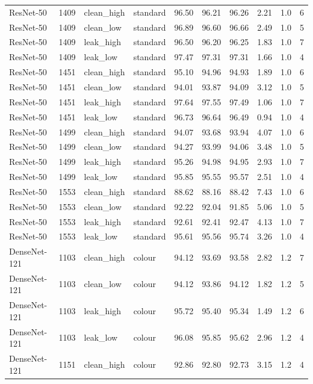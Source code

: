 {\begin{longtable}{lrllrrrrrr}
ResNet-50 & 1409 & clean\_high & standard & 96.50 & 96.21 & 96.26 & 2.21 & 1.0 & 6 \\
ResNet-50 & 1409 & clean\_low & standard & 96.89 & 96.60 & 96.66 & 2.49 & 1.0 & 5 \\
ResNet-50 & 1409 & leak\_high & standard & 96.50 & 96.20 & 96.25 & 1.83 & 1.0 & 7 \\
ResNet-50 & 1409 & leak\_low & standard & 97.47 & 97.31 & 97.31 & 1.66 & 1.0 & 4 \\
ResNet-50 & 1451 & clean\_high & standard & 95.10 & 94.96 & 94.93 & 1.89 & 1.0 & 6 \\
ResNet-50 & 1451 & clean\_low & standard & 94.01 & 93.87 & 94.09 & 3.12 & 1.0 & 5 \\
ResNet-50 & 1451 & leak\_high & standard & 97.64 & 97.55 & 97.49 & 1.06 & 1.0 & 7 \\
ResNet-50 & 1451 & leak\_low & standard & 96.73 & 96.64 & 96.49 & 0.94 & 1.0 & 4 \\
ResNet-50 & 1499 & clean\_high & standard & 94.07 & 93.68 & 93.94 & 4.07 & 1.0 & 6 \\
ResNet-50 & 1499 & clean\_low & standard & 94.27 & 93.99 & 94.06 & 3.48 & 1.0 & 5 \\
ResNet-50 & 1499 & leak\_high & standard & 95.26 & 94.98 & 94.95 & 2.93 & 1.0 & 7 \\
ResNet-50 & 1499 & leak\_low & standard & 95.85 & 95.55 & 95.57 & 2.51 & 1.0 & 4 \\
ResNet-50 & 1553 & clean\_high & standard & 88.62 & 88.16 & 88.42 & 7.43 & 1.0 & 6 \\
ResNet-50 & 1553 & clean\_low & standard & 92.22 & 92.04 & 91.85 & 5.06 & 1.0 & 5 \\
ResNet-50 & 1553 & leak\_high & standard & 92.61 & 92.41 & 92.47 & 4.13 & 1.0 & 7 \\
ResNet-50 & 1553 & leak\_low & standard & 95.61 & 95.56 & 95.74 & 3.26 & 1.0 & 4 \\
DenseNet-121 & 1103 & clean\_high & colour & 94.12 & 93.69 & 93.58 & 2.82 & 1.2 & 7 \\
DenseNet-121 & 1103 & clean\_low & colour & 94.12 & 93.86 & 94.12 & 1.82 & 1.2 & 5 \\
DenseNet-121 & 1103 & leak\_high & colour & 95.72 & 95.40 & 95.34 & 1.49 & 1.2 & 6 \\
DenseNet-121 & 1103 & leak\_low & colour & 96.08 & 95.85 & 95.62 & 2.96 & 1.2 & 4 \\
DenseNet-121 & 1151 & clean\_high & colour & 92.86 & 92.80 & 92.73 & 3.15 & 1.2 & 4 \\

\end{longtable}}

